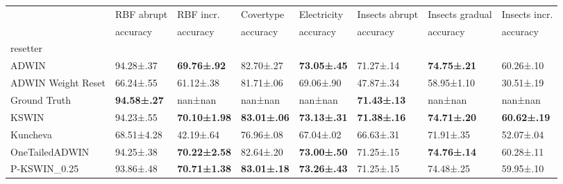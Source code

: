 \begin{tabular}{llllllll}
\toprule
 & RBF abrupt & RBF incr. & Covertype & Electricity & Insects abrupt & Insects gradual & Insects incr. \\
 & accuracy & accuracy & accuracy & accuracy & accuracy & accuracy & accuracy \\
resetter &  &  &  &  &  &  &  \\
\midrule
ADWIN & 94.28±.37 & \bfseries 69.76±.92 & 82.70±.27 & \bfseries 73.05±.45 & 71.27±.14 & \bfseries 74.75±.21 & 60.26±.10 \\
ADWIN Weight Reset & 66.24±.55 & 61.12±.38 & 81.71±.06 & 69.06±.90 & 47.87±.34 & 58.95±1.10 & 30.51±.19 \\
Ground Truth & \bfseries 94.58±.27 & nan±nan & nan±nan & nan±nan & \bfseries 71.43±.13 & nan±nan & nan±nan \\
KSWIN & 94.23±.55 & \bfseries 70.10±1.98 & \bfseries 83.01±.06 & \bfseries 73.13±.31 & \bfseries 71.38±.16 & \bfseries 74.71±.20 & \bfseries 60.62±.19 \\
Kuncheva & 68.51±4.28 & 42.19±.64 & 76.96±.08 & 67.04±.02 & 66.63±.31 & 71.91±.35 & 52.07±.04 \\
OneTailedADWIN & 94.25±.38 & \bfseries 70.22±2.58 & 82.64±.20 & \bfseries 73.00±.50 & 71.25±.15 & \bfseries 74.76±.14 & 60.28±.11 \\
P-KSWIN_0.25 & 93.86±.48 & \bfseries 70.71±1.38 & \bfseries 83.01±.18 & \bfseries 73.26±.43 & 71.25±.15 & 74.48±.25 & 59.95±.10 \\
\bottomrule
\end{tabular}
